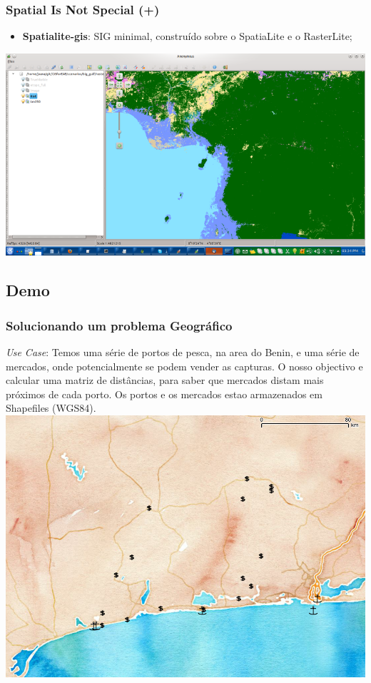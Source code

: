 \documentclass[hyperref={pdfpagelabels=true}]{beamer}
\begin{document}
\begin{frame}
\frametitle{Spatial Is Not Special (+)}
    \begin{itemize}
      \item<1-> \textbf{Spatialite-gis}: SIG minimal, constru\'{i}do sobre o SpatiaLite e o RasterLite;
    \end{itemize}
  \includegraphics[scale=0.4]{spatialite_gis.png}        
\end{frame}

\subsection{Demo}
\begin{frame}
\frametitle{Solucionando um problema Geogr\'{a}fico}
\small{
\textit{Use Case}: Temos uma s\'{e}rie de portos de pesca, na area do Benin, e uma s\'{e}rie de mercados, onde potencialmente se podem vender as capturas.
O nosso objectivo e calcular uma matriz de dist\^{a}ncias, para saber que mercados distam mais pr\'{o}ximos de cada porto. Os portos e os mercados estao armazenados em Shapefiles (WGS84).
}
\includegraphics[scale=0.3]{distances1.png}
\end{frame}
\end{document}
